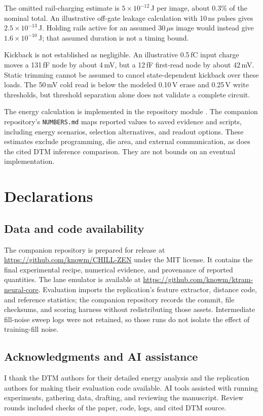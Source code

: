 \documentclass[reprint,amsmath,amssymb,aps,pra,floatfix,nofootinbib]{revtex4-2}
\begin{document}
The omitted rail-charging estimate is $5\times10^{-12}$\,J per image, about 0.3\% of the nominal total. An illustrative off-gate leakage calculation with 10\,ns pulses gives $2.5\times10^{-13}$\,J. Holding rails active for an assumed 30\,$\mu$s image would instead give $1.6\times10^{-10}$\,J; that assumed duration is not a timing bound.

Kickback is not established as negligible. An illustrative 0.5\,fC input charge moves a 131\,fF node by about 4\,mV, but a 12\,fF first-read node by about 42\,mV. Static trimming cannot be assumed to cancel state-dependent kickback over these loads. The 50\,mV cold read is below the modeled 0.10\,V erase and 0.25\,V write thresholds, but threshold separation alone does not validate a complete circuit.

The energy calculation is implemented in the repository module . The companion repository's \texttt{NUMBERS.md} maps reported values to saved evidence and scripts, including energy scenarios, selection alternatives, and readout options. These estimates exclude programming, die area, and external communication, as does the cited DTM inference comparison. They are not bounds on an eventual implementation.

\section*{Declarations}
\subsection*{Data and code availability}
The companion repository is prepared for release at \url{https://github.com/knowm/CHILL-ZEN} under the MIT license. It contains the final experimental recipe, numerical evidence, and provenance of reported quantities. The lane emulator is available at \url{https://github.com/knowm/ktram-neural-core}. Evaluation imports the replication's feature extractor, distance code, and reference statistics; the companion repository records the commit, file checksums, and scoring harness without redistributing those assets. Intermediate fill-noise sweep logs were not retained, so those runs do not isolate the effect of training-fill noise.

\subsection*{Acknowledgments and AI assistance}
I thank the DTM authors for their detailed energy analysis and the replication authors for making their evaluation code available. AI tools assisted with running experiments, gathering data, drafting, and reviewing the manuscript. Review rounds included checks of the paper, code, logs, and cited DTM source. 
\end{document}
